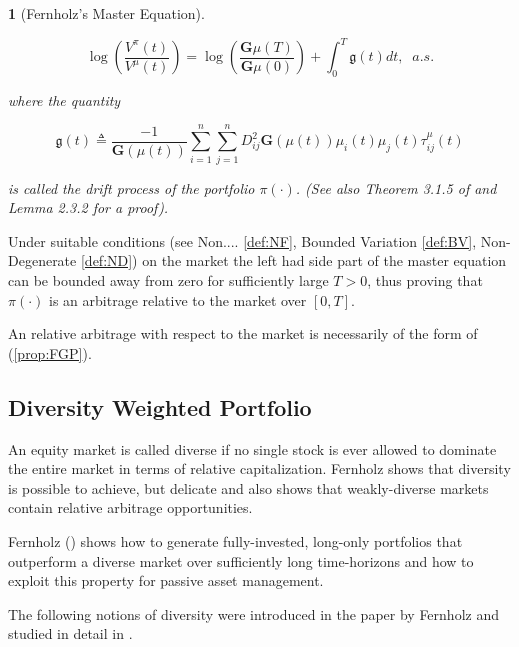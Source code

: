 \documentclass[british]{amsart}
\numberwithin{equation}{section}
\numberwithin{figure}{section}
\theoremstyle{plain}
\newtheorem{thm}{\protect\theoremname}[section]
\theoremstyle{definition}
\theoremstyle{plain}
\theoremstyle{plain}
\theoremstyle{plain}
\theoremstyle{remark}
\theoremstyle{plain}
\providecommand{\theoremname}{Theorem}
\begin{document}
\begin{thm} [Fernholz's Master Equation]
	\label{thm:masterequation}

	\begin{equation}
		\log\left(\frac{V^{\pi}(t)}{V^{\mu}(t)}\right)=\log\left(\frac{\mathbf{G}\mu(T)}{\mathbf{G}\mu(0)}\right)+\int_{0}^{T}\mathfrak{g}(t)dt,\;\;a.s.
	\end{equation}

where the quantity

	\begin{equation}
		\mathfrak{g}(t)\triangleq\frac{-1}{\mathbf{G}(\mu(t))}\sum_{i=1}^{n}\sum_{j=1}^{n}D_{ij}^{2}\mathbf{G}(\mu(t))\mu_{i}(t)\mu_{j}(t)\tau_{ij}^{\mu}(t)
	\end{equation}

is called the \textit{drift process} of the portfolio $\pi(\cdot)$. (See also Theorem 3.1.5 of \cite{fernholz2002} and Lemma 2.3.2 for a proof).

\end{thm}

Under suitable conditions (see Non.... \ref{def:NF}, Bounded Variation \ref{def:BV}, Non-Degenerate \ref{def:ND}) on the market the left had side part of the master equation can be bounded away from zero
for sufficiently large $T>0$, thus proving that $\pi(\cdot)$ is an arbitrage relative to the market over $[0,T]$.

An relative arbitrage with respect to the market is necessarily of the form of (\ref{prop:FGP}).

\newpage 

\subsection{Diversity Weighted Portfolio}

An equity market is called diverse if no single stock is ever allowed to dominate the entire market in
terms of relative capitalization. Fernholz \cite{fernholz2005} shows that diversity is possible to achieve, but delicate and also shows that weakly-diverse markets contain relative arbitrage opportunities.

Fernholz (\cite{fernholz2002}) shows how to generate fully-invested, long-only portfolios that outperform a diverse market over sufficiently long time-horizons and how to exploit this property for passive asset
management.

The following notions of diversity were introduced in the paper by Fernholz \cite{fernholz1999diversity} and studied in detail in \cite{fernholz2002}.
\end{document}
